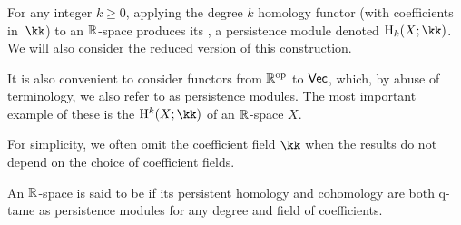 \subsubsection{}

For any integer $k \geq 0$, applying the degree $k$ homology functor (with coefficients in~$\kk$) to an $\R$-space produces its , a persistence module denoted $\rH_k(X; \kk)$.
We will also consider the reduced version of this construction.

It is also convenient to consider functors from $\R^\op$ to $\Vec$, which, by abuse of terminology, we also refer to as persistence modules.
The most important example of these is the  $\rH^k(X; \kk)$ of an $\R$-space $X$.

For simplicity, we often omit the coefficient field $\kk$ when the results do not depend on the choice of coefficient fields.

An $\R$-space is said to be  if its persistent homology and cohomology are both q-tame as persistence modules for any degree and field of coefficients.

%
%
%

